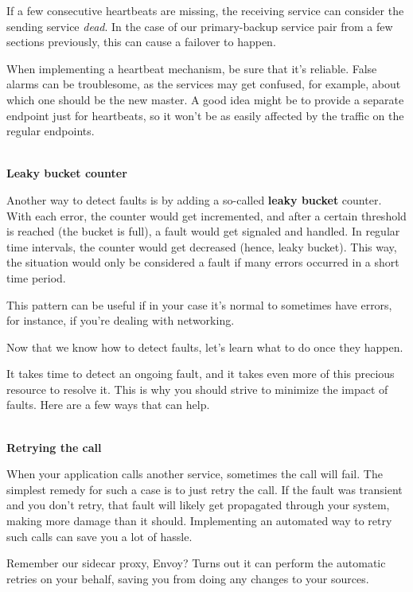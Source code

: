 If a few consecutive heartbeats are missing, the receiving service can consider the sending service \textit{dead}. In the case of our primary-backup service pair from a few sections previously, this can cause a failover to happen.

When implementing a heartbeat mechanism, be sure that it's reliable. False alarms can be troublesome, as the services may get confused, for example, about which one should be the new master. A good idea might be to provide a separate endpoint just for heartbeats, so it won't be as easily affected by the traffic on the regular endpoints.

\hspace*{\fill} \\ %
\noindent
\textbf{Leaky bucket counter}

Another way to detect faults is by adding a so-called \textbf{leaky bucket} counter. With each error, the counter would get incremented, and after a certain threshold is reached (the bucket is full), a fault would get signaled and handled. In regular time intervals, the counter would get decreased (hence, leaky bucket). This way, the situation would only be considered a fault if many errors occurred in a short time period.

This pattern can be useful if in your case it's normal to sometimes have errors, for instance, if you're dealing with networking.

Now that we know how to detect faults, let's learn what to do once they happen.


It takes time to detect an ongoing fault, and it takes even more of this precious resource to resolve it. This is why you should strive to minimize the impact of faults. Here are a few ways that can help.


\hspace*{\fill} \\ %
\noindent
\textbf{Retrying the call}

When your application calls another service, sometimes the call will fail. The simplest remedy for such a case is to just retry the call. If the fault was transient and you don't retry, that fault will likely get propagated through your system, making more damage than it should. Implementing an automated way to retry such calls can save you a lot of hassle.

Remember our sidecar proxy, Envoy? Turns out it can perform the automatic retries on your behalf, saving you from doing any changes to your sources.

